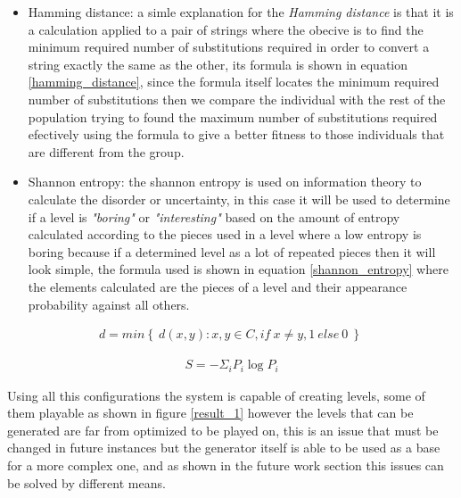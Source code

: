 \documentclass[conference]{IEEEtran}
\begin{document}
\begin{itemize}
    \item Hamming distance: a simle explanation for the \textit{Hamming
    distance} is that it is a calculation applied to a pair of strings where the
    obecive is to find the minimum required number of substitutions required in
    order to convert a string exactly the same as the other, its formula is
    shown in equation \ref{hamming_distance}, since the formula itself locates
    the minimum required number of substitutions then we compare the individual
    with the rest of the population trying to found the maximum number of
    substitutions required efectively using the formula to give a better fitness
    to those individuals that are different from the group.
    \item Shannon entropy: the shannon entropy is used on information theory to
    calculate the disorder or uncertainty, in this case it will be used to
    determine if a level is \textit{"boring"} or \textit{"interesting"} based on
    the amount of entropy calculated according to the pieces used in a level
    where a low entropy is boring because if a determined level as a lot of
    repeated pieces then it will look simple, the formula used is shown in
    equation \ref{shannon_entropy} where the elements calculated are the pieces
    of a level and their appearance probability against all others.
\end{itemize}

\begin{equation}
    \begin{aligned}
    d = min \left\{ \ d(x,y): x,y \in C, if \: x \neq y, 1 \: else \: 0 \: \right\} \
    \end{aligned}
    \label{hamming_distance}
\end{equation}

\begin{equation}
    \begin{aligned}
    S = - \Sigma_i P_i \log P_i
    \end{aligned}
    \label{shannon_entropy}
\end{equation}

Using all this configurations the system is capable of creating levels, some of
them playable as shown in figure \ref{result_1} however the levels that can be
generated are far from optimized to be played on, this is an issue that must be
changed in future instances but the generator itself is able to be used as a
base for a more complex one, and as shown in the future work section this issues
can be solved by different means.
\end{document}

